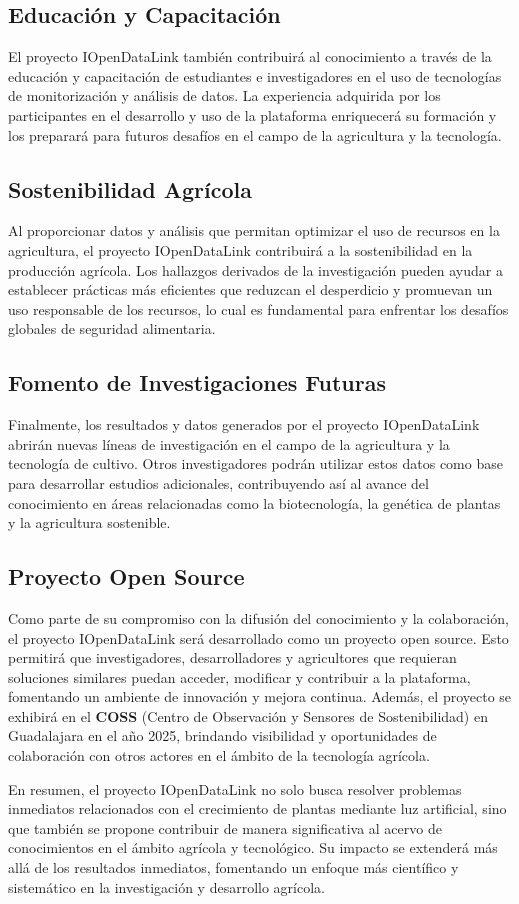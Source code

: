 \subsection{Educación y Capacitación}
El proyecto IOpenDataLink también contribuirá al conocimiento a través de la educación y capacitación de estudiantes e investigadores en el uso de tecnologías de monitorización y análisis de datos. La experiencia adquirida por los participantes en el desarrollo y uso de la plataforma enriquecerá su formación y los preparará para futuros desafíos en el campo de la agricultura y la tecnología.

\subsection{Sostenibilidad Agrícola}
Al proporcionar datos y análisis que permitan optimizar el uso de recursos en la agricultura, el proyecto IOpenDataLink contribuirá a la sostenibilidad en la producción agrícola. Los hallazgos derivados de la investigación pueden ayudar a establecer prácticas más eficientes que reduzcan el desperdicio y promuevan un uso responsable de los recursos, lo cual es fundamental para enfrentar los desafíos globales de seguridad alimentaria.

\subsection{Fomento de Investigaciones Futuras}
Finalmente, los resultados y datos generados por el proyecto IOpenDataLink abrirán nuevas líneas de investigación en el campo de la agricultura y la tecnología de cultivo. Otros investigadores podrán utilizar estos datos como base para desarrollar estudios adicionales, contribuyendo así al avance del conocimiento en áreas relacionadas como la biotecnología, la genética de plantas y la agricultura sostenible.

\subsection{Proyecto Open Source}
Como parte de su compromiso con la difusión del conocimiento y la colaboración, el proyecto IOpenDataLink será desarrollado como un proyecto open source. Esto permitirá que investigadores, desarrolladores y agricultores que requieran soluciones similares puedan acceder, modificar y contribuir a la plataforma, fomentando un ambiente de innovación y mejora continua. Además, el proyecto se exhibirá en el \textbf{COSS} (Centro de Observación y Sensores de Sostenibilidad) en Guadalajara en el año 2025, brindando visibilidad y oportunidades de colaboración con otros actores en el ámbito de la tecnología agrícola.

En resumen, el proyecto IOpenDataLink no solo busca resolver problemas inmediatos relacionados con el crecimiento de plantas mediante luz artificial, sino que también se propone contribuir de manera significativa al acervo de conocimientos en el ámbito agrícola y tecnológico. Su impacto se extenderá más allá de los resultados inmediatos, fomentando un enfoque más científico y sistemático en la investigación y desarrollo agrícola.
